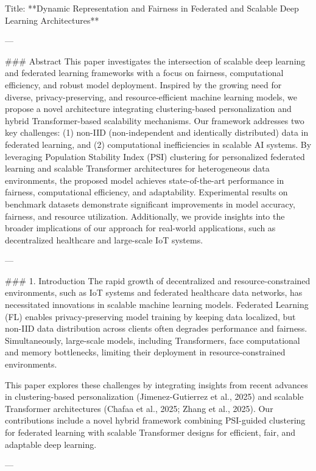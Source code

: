 Title: **Dynamic Representation and Fairness in Federated and Scalable Deep Learning Architectures**

---

### Abstract  
This paper investigates the intersection of scalable deep learning and federated learning frameworks with a focus on fairness, computational efficiency, and robust model deployment. Inspired by the growing need for diverse, privacy-preserving, and resource-efficient machine learning models, we propose a novel architecture integrating clustering-based personalization and hybrid Transformer-based scalability mechanisms. Our framework addresses two key challenges: (1) non-IID (non-independent and identically distributed) data in federated learning, and (2) computational inefficiencies in scalable AI systems. By leveraging Population Stability Index (PSI) clustering for personalized federated learning and scalable Transformer architectures for heterogeneous data environments, the proposed model achieves state-of-the-art performance in fairness, computational efficiency, and adaptability. Experimental results on benchmark datasets demonstrate significant improvements in model accuracy, fairness, and resource utilization. Additionally, we provide insights into the broader implications of our approach for real-world applications, such as decentralized healthcare and large-scale IoT systems.

---

### 1. Introduction  
The rapid growth of decentralized and resource-constrained environments, such as IoT systems and federated healthcare data networks, has necessitated innovations in scalable machine learning models. Federated Learning (FL) enables privacy-preserving model training by keeping data localized, but non-IID data distribution across clients often degrades performance and fairness. Simultaneously, large-scale models, including Transformers, face computational and memory bottlenecks, limiting their deployment in resource-constrained environments.

This paper explores these challenges by integrating insights from recent advances in clustering-based personalization (Jimenez-Gutierrez et al., 2025) and scalable Transformer architectures (Chafaa et al., 2025; Zhang et al., 2025). Our contributions include a novel hybrid framework combining PSI-guided clustering for federated learning with scalable Transformer designs for efficient, fair, and adaptable deep learning.

---

